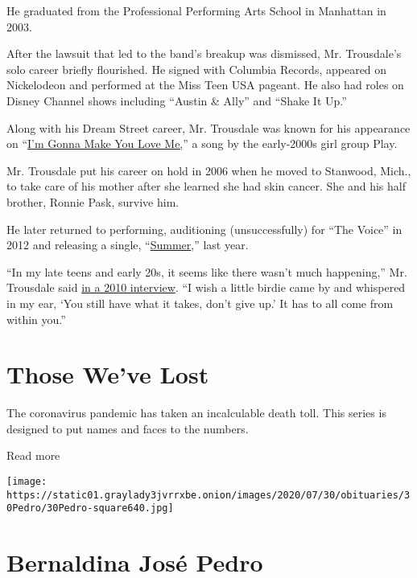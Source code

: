 He graduated from the Professional Performing Arts School in Manhattan
in 2003.

After the lawsuit that led to the band's breakup was dismissed, Mr.
Trousdale's solo career briefly flourished. He signed with Columbia
Records, appeared on Nickelodeon and performed at the Miss Teen USA
pageant. He also had roles on Disney Channel shows including ``Austin \&
Ally'' and ``Shake It Up.''

Along with his Dream Street career, Mr. Trousdale was known for his
appearance on ``\href{https://www.youtube.com/watch?v=s3Y3FMKkfBE}{I'm
Gonna Make You Love Me,}'' a song by the early-2000s girl group Play.

Mr. Trousdale put his career on hold in 2006 when he moved to Stanwood,
Mich., to take care of his mother after she learned she had skin cancer.
She and his half brother, Ronnie Pask, survive him.

He later returned to performing, auditioning (unsuccessfully) for ``The
Voice'' in 2012 and releasing a single,
``\href{https://www.youtube.com/watch?v=FgRXH5RJLO8}{Summer},'' last
year.

``In my late teens and early 20s, it seems like there wasn't much
happening,'' Mr. Trousdale said
\href{https://www.feelingthevibe.com/interviews/11-question-with-chris-trousdale/}{in
a 2010 interview}. ``I wish a little birdie came by and whispered in my
ear, `You still have what it takes, don't give up.' It has to all come
from within you.''

\href{https://www.nytimes3xbfgragh.onion/interactive/2020/obituaries/people-died-coronavirus-obituaries.html?action=click\&pgtype=Article\&state=default\&region=BELOW_MAIN_CONTENT\&context=covid_obits_promo}{}

\hypertarget{those-weve-lost}{%
\section{Those We've Lost}\label{those-weve-lost}}

The coronavirus pandemic has taken an incalculable death toll. This
series is designed to put names and faces to the numbers.

Read more

\texttt{[image: https://static01.graylady3jvrrxbe.onion/images/2020/07/30/obituaries/30Pedro/30Pedro-square640.jpg]}

\hypertarget{bernaldina-josuxe9-pedro}{%
\section{Bernaldina José Pedro}\label{bernaldina-josuxe9-pedro}}

